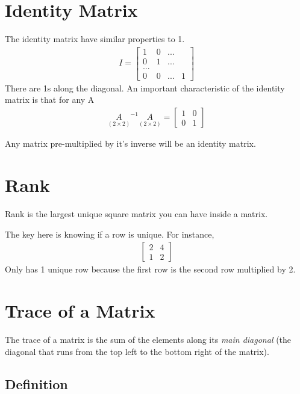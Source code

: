 \documentclass[12pt]{article}
\begin{document}
\section{Identity Matrix}

The identity matrix have similar properties to 1. 
\begin{align}
    I = \begin{bmatrix}
        1 & 0 &  ... \\
        0 & 1 & ... \\
        ... & \\
        0 & 0 & ... & 1
    \end{bmatrix}
\end{align}
There are 1s along the diagonal. An important characteristic of the identity matrix is that for any A
\begin{align}
    \underset{(2 \times 2)} A^{-1}  \underset{(2 \times 2)} A = \begin{bmatrix}
                    1 & 0 \\
                    0 & 1
                \end{bmatrix}
\end{align}

Any matrix pre-multiplied by it's inverse will be an identity matrix. 

\section{Rank}
Rank is the largest unique square matrix you can have inside a matrix.

The key here is knowing if a row is unique.  For instance,
\begin{align}
    \begin{bmatrix}
        2 & 4 \\
        1 & 2
    \end{bmatrix}
\end{align}
Only has 1 unique row because the first row is the second row multiplied by 2. 

\section{Trace of a Matrix}

The trace of a matrix is the sum of the elements along its \textit{main diagonal} (the diagonal that runs from the top left to the bottom right of the matrix).

\subsection*{Definition}
\end{document}
